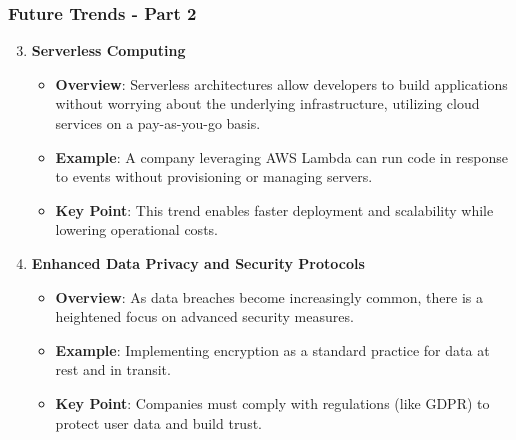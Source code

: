 \documentclass{beamer}
\begin{document}
\begin{frame}[fragile]
    \frametitle{Future Trends - Part 2}
    
    \begin{enumerate}
        \setcounter{enumi}{2}
        \item \textbf{Serverless Computing}
            \begin{itemize}
                \item \textbf{Overview}: Serverless architectures allow developers to build applications without worrying about the underlying infrastructure, utilizing cloud services on a pay-as-you-go basis.
                \item \textbf{Example}: A company leveraging AWS Lambda can run code in response to events without provisioning or managing servers.
                \item \textbf{Key Point}: This trend enables faster deployment and scalability while lowering operational costs.
            \end{itemize}
        
        \item \textbf{Enhanced Data Privacy and Security Protocols}
            \begin{itemize}
                \item \textbf{Overview}: As data breaches become increasingly common, there is a heightened focus on advanced security measures.
                \item \textbf{Example}: Implementing encryption as a standard practice for data at rest and in transit.
                \item \textbf{Key Point}: Companies must comply with regulations (like GDPR) to protect user data and build trust.
            \end{itemize}
    \end{enumerate}
    
\end{frame}
\end{document}

